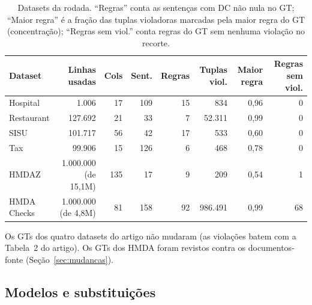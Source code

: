 \documentclass[11pt,a4paper]{article}
\begin{document}
\begin{table}[H]
\centering\small\setlength{\tabcolsep}{4.5pt}
\begin{tabular}{lrrrrrrr}
\toprule
Dataset & Linhas usadas & Cols & Sent. & Regras & Tuplas viol. & Maior regra & Regras sem viol.\\
\midrule
Hospital & 1.006 & 17 & 109 & 15 & 834 & 0,96 & 0\\
Restaurant & 127.692 & 21 & 33 & 7 & 52.311 & 0,99 & 0\\
SISU & 101.717 & 56 & 42 & 17 & 533 & 0,60 & 0\\
Tax & 99.906 & 15 & 126 & 6 & 468 & 0,78 & 0\\
HMDAZ & 1.000.000 (de 15,1M) & 135 & 17 & 9 & 209 & 0,54 & 1\\
HMDA Checks & 1.000.000 (de 4,8M) & 81 & 158 & 92 & 986.491 & 0,99 & 68\\
\bottomrule
\end{tabular}
\caption{Datasets da rodada. ``Regras'' conta as sentenças com DC não nula no GT; ``Maior regra'' é a fração das
tuplas violadoras marcadas pela maior regra do GT (concentração); ``Regras sem viol.'' conta regras do GT sem
nenhuma violação no recorte.}
\end{table}

\noindent Os GTs dos quatro datasets do artigo não mudaram (as violações batem com a Tabela~2 do artigo). Os GTs
dos HMDA foram revistos contra os documentos-fonte (Seção~\ref{sec:mudancas}).

\subsection{Modelos e substituições}
\end{document}
